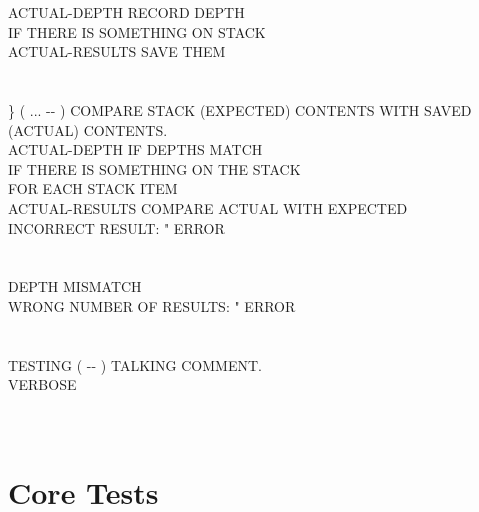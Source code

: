 \begin{tt}
\tab {}  ACTUAL-DEPTH \word{!}				\tab[5.9]   RECORD DEPTH\\
\tab {} 										\tab[16.1]  IF THERE IS SOMETHING ON STACK\\
  ACTUAL-RESULTS   \word{+} \word{!}  \tab[.6]  SAVE THEM\\
\tab {} \word{;} \\
\\
\word{:} \} \tab[2.8]  ( ... -{}- ) COMPARE STACK (EXPECTED) CONTENTS WITH SAVED\\
\tab[5.2]  (ACTUAL) CONTENTS.\\
\tab {} ACTUAL-DEPTH  \word{=} 		\tab[4.85]   IF DEPTHS MATCH\\
\tab[2]   						\tab[9.05]  IF THERE IS SOMETHING ON THE STACK\\
 											\tab[14.8]  FOR EACH STACK ITEM\\
\tab[4]			 ACTUAL-RESULTS   \word{+} 	\tab[.6]  COMPARE ACTUAL WITH EXPECTED\\
\tab[4]			   INCORRECT RESULT: " ERROR  \\
\tab[3]		\\
\tab[2] \\
\tab {}												\tab[17.4]  DEPTH MISMATCH\\
\tab[2]  WRONG NUMBER OF RESULTS: " ERROR\\
\tab {} \word{;} \\
\\
\word{:} TESTING \tab[.65]  ( -{}- ) TALKING COMMENT.\\
\tab {} VERBOSE  \\
\tab {}       \word{!}\\
\tab {}  \word{!} \\
\tab {} \word{;}
\end{tt}

\section{Core Tests} %

